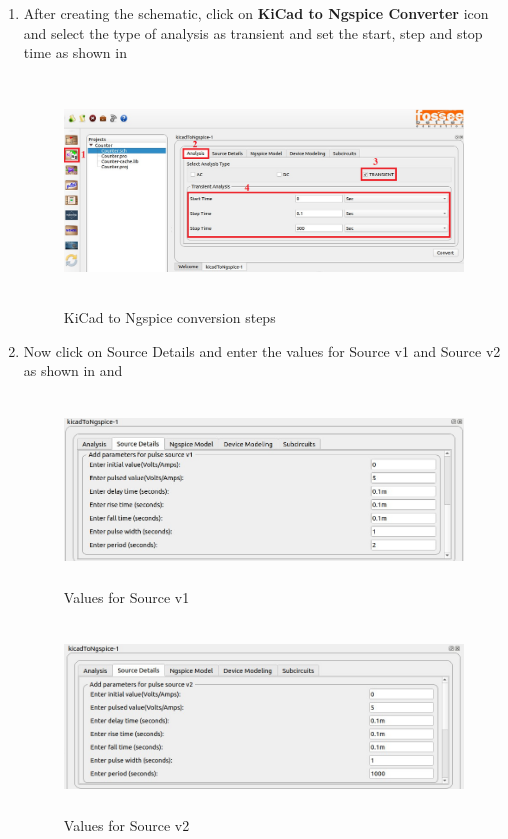 \begin{enumerate}

\item After creating the schematic, click on \textbf{KiCad to Ngspice Converter} icon and select the type of analysis as transient and set the start, step and stop time as shown in 

\begin{figure}[H]
\centering
\includegraphics[width = 14cm, height =6cm]{./NgVeri/KiCadtoNgspice.png}
\caption{KiCad to Ngspice conversion steps}
\label{kitong}
\end{figure}
 
 
\item Now click on Source Details and enter the values for Source v1 and Source v2 as shown in  and 

\begin{figure}[H]
\centering
\includegraphics[width = 13cm, height =5cm]{./NgVeri/sourcev1.png}
\caption{Values for Source v1}
\label{sourcev1}
\end{figure}

\begin{figure}[H]
\centering
\includegraphics[width = 13cm, height =5cm]{./NgVeri/sourcev2.png}
\caption{Values for Source v2}
\label{sourcev2}
\end{figure}


\end{enumerate}

